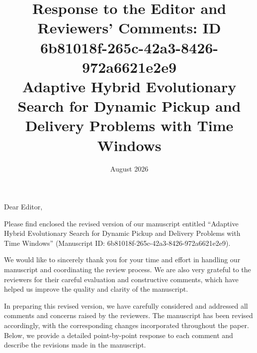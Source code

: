 \documentclass[11pt]{article}
\begin{document}
\title{
    {\bfseries Response to the Editor and Reviewers' Comments: ID 6b81018f-265c-42a3-8426-972a6621e2e9}\\\vspace*{2cm}
    {\Large  Adaptive Hybrid Evolutionary Search for Dynamic Pickup and Delivery Problems with Time Windows}\\\vspace*{2cm}
   \vspace*{5cm} }



\date{August 2026}
\maketitle\thispagestyle{empty}\newpage
\setlength{\parskip}{2ex plus0.5ex minus0.2ex} %


\thispagestyle{empty} \vspace{-10mm}




\noindent Dear Editor,

\medskip

\noindent
Please find enclosed the revised version of our manuscript entitled
``Adaptive Hybrid Evolutionary Search for Dynamic Pickup and Delivery Problems with Time Windows''
(Manuscript ID: 6b81018f-265c-42a3-8426-972a6621e2e9).

\medskip

\noindent
We would like to sincerely thank you for your time and effort in handling our manuscript and coordinating the review process. We are also very grateful to the reviewers for their careful evaluation and constructive comments, which have helped us improve the quality and clarity of the manuscript.

\medskip

\noindent
In preparing this revised version, we have carefully considered and addressed all comments and concerns raised by the reviewers. The manuscript has been revised accordingly, with the corresponding changes incorporated throughout the paper. Below, we provide a detailed point-by-point response to each comment and describe the revisions made in the manuscript.
\end{document}
